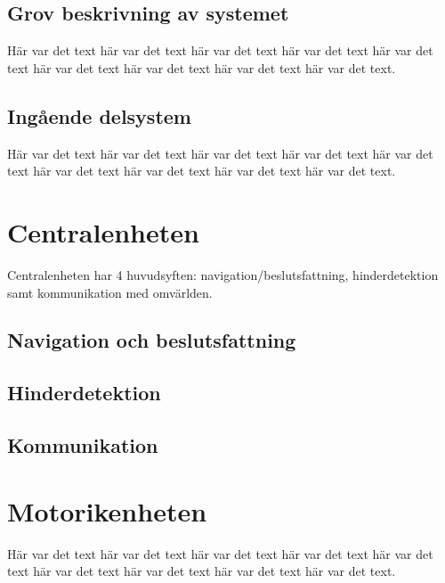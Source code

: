 \documentclass[a4paper,titlepage,12pt]{article}
\begin{document}
	\subsection{Grov beskrivning av systemet}
	Här var det text här var det text här var det text
	här var det text här var det text här var det text
	här var det text här var det text här var det text.
	
	
	\subsection{Ingående delsystem}
	Här var det text här var det text här var det text
	här var det text här var det text här var det text
	här var det text här var det text här var det text.
	
	
	\section{Centralenheten}
	Centralenheten har 4 huvudsyften: navigation/beslutsfattning, hinderdetektion samt
	kommunikation med omvärlden.

	\subsection{Navigation och beslutsfattning}

	\subsection{Hinderdetektion}

	\subsection{Kommunikation}



	
	\section{Motorikenheten}
	Här var det text här var det text här var det text
	här var det text här var det text här var det text
	här var det text här var det text här var det text.
	
	
\end{document}
